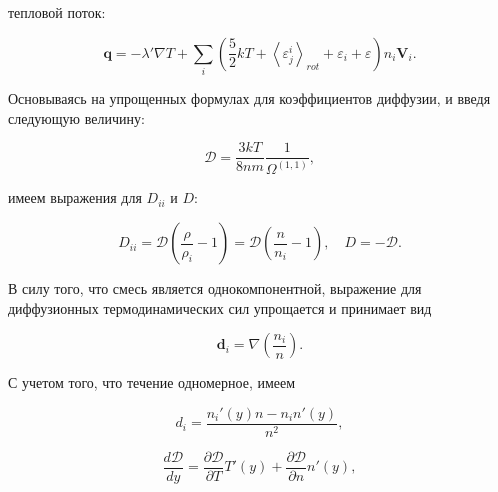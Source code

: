 \documentclass[12pt]{article}
\begin{document}
тепловой поток:

\begin{equation}
  \mathbf{q} = -\lambda' \nabla T + \sum_{i} \left(\frac{5}{2}kT + \left<\varepsilon^{i}_{j} \right>_{rot} + \varepsilon_{i} + \varepsilon \right) n_{i} \mathbf{V}_{i}.
\end{equation}

Основываясь на упрощенных формулах для коэффициентов диффузии, и введя следующую величину:

\begin{equation}
  \mathcal{D} = \frac{3kT}{8nm}\frac{1}{\Omega^{(1,1)}},
\end{equation}

имеем выражения для $D_{ii}$ и $D$:

\begin{equation}
  D_{ii} = \mathcal{D} \left(\frac{\rho}{\rho_{i}} - 1 \right)=\mathcal{D} \left(\frac{n}{n_{i}} - 1 \right),\quad D = -\mathcal{D}.
\end{equation}

В силу того, что смесь является однокомпонентной, выражение для диффузионных термодинамических сил упрощается и принимает вид

\begin{equation}
  \mathbf{d}_{i} = \nabla \left(\frac{n_{i}}{n} \right).
\end{equation}

С учетом того, что течение одномерное, имеем

\begin{equation}
  d_{i} = \frac{n_{i}'(y)n - n_{i}n'(y)}{n^2},
\end{equation}


\begin{equation}
  \frac{d\mathcal{D}}{dy} = \frac{\partial \mathcal{D}}{\partial T} T'(y) + \frac{\partial \mathcal{D}}{\partial n} n'(y),
\end{equation}

\end{document}
